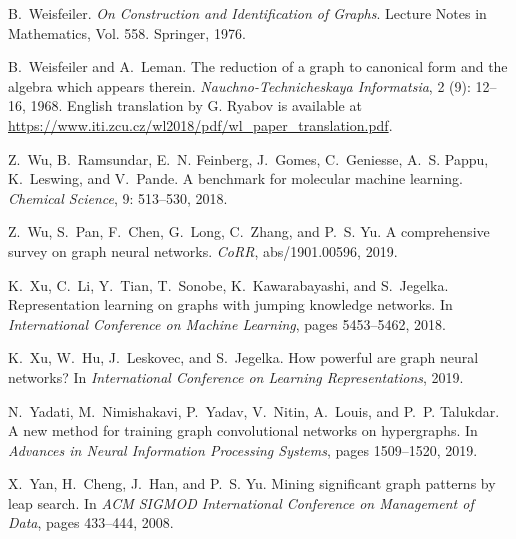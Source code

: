 \documentclass{article}
\theoremstyle{definition}
\begin{document}
\begin{thebibliography}{125}
	B.~Weisfeiler.
	\newblock \emph{On Construction and Identification of Graphs}.
	\newblock Lecture Notes in Mathematics, Vol. 558. Springer, 1976.
	
	B.~Weisfeiler and A.~Leman.
	\newblock The reduction of a graph to canonical form and the algebra which
	appears therein.
	\newblock \emph{Nauchno-Technicheskaya Informatsia}, 2 (9):
	12--16, 1968.
	\newblock English translation by G. Ryabov is available at
	\url{https://www.iti.zcu.cz/wl2018/pdf/wl_paper_translation.pdf}.
	
	Z.~Wu, B.~Ramsundar, E.~N. Feinberg, J.~Gomes, C.~Geniesse, A.~S. Pappu,
	K.~Leswing, and V.~Pande.
	 {A} benchmark for molecular machine learning.
	\newblock \emph{Chemical Science}, 9: 513--530, 2018.
	
	Z.~Wu, S.~Pan, F.~Chen, G.~Long, C.~Zhang, and P.~S. Yu.
	\newblock A comprehensive survey on graph neural networks.
	\newblock \emph{CoRR}, abs/1901.00596, 2019.
	
	K.~Xu, C.~Li, Y.~Tian, T.~Sonobe, K.~Kawarabayashi, and S.~Jegelka.
	\newblock Representation learning on graphs with jumping knowledge networks.
	\newblock In \emph{International Conference on Machine Learning}, pages
	5453--5462, 2018.
	
	K.~Xu, W.~Hu, J.~Leskovec, and S.~Jegelka.
	\newblock How powerful are graph neural networks?
	\newblock In \emph{International Conference on Learning Representations}, 2019.
	
	N.~Yadati, M.~Nimishakavi, P.~Yadav, V.~Nitin, A.~Louis, and P.~P. Talukdar.
	 {A} new method for training graph convolutional networks
	on hypergraphs.
	\newblock In \emph{Advances in Neural Information Processing Systems}, pages
	1509--1520, 2019.
	
	X.~Yan, H.~Cheng, J.~Han, and P.~S. Yu.
	\newblock Mining significant graph patterns by leap search.
	\newblock In \emph{{ACM} {SIGMOD} International Conference on Management of
		Data}, pages 433--444, 2008.
	

\end{thebibliography}
\end{document}
